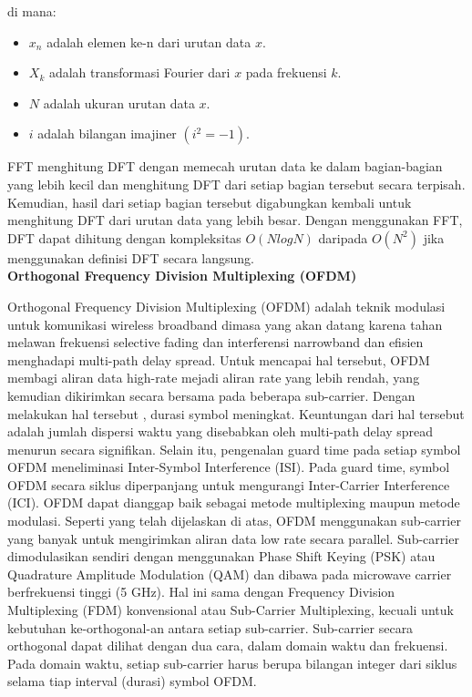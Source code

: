 \documentclass{article}
\begin{document}
di mana:
\begin{itemize}
    \item $x_n$ adalah elemen ke-n dari urutan data $x$.
    \item $X_k$ adalah transformasi Fourier dari $x$ pada frekuensi $k$.
    \item $N$ adalah ukuran urutan data $x$.
    \item $i$ adalah bilangan imajiner $(i^2 = -1)$.
\end{itemize}

FFT menghitung DFT dengan memecah urutan data ke dalam bagian-bagian yang lebih kecil dan menghitung DFT dari setiap bagian tersebut secara terpisah. Kemudian, hasil dari setiap bagian tersebut digabungkan kembali untuk menghitung DFT dari urutan data yang lebih besar. Dengan menggunakan FFT, DFT dapat dihitung dengan kompleksitas $O(N log N)$ daripada $O(N^2)$ jika menggunakan definisi DFT secara langsung.\\

\textbf{Orthogonal Frequency Division Multiplexing (OFDM)}

Orthogonal Frequency Division Multiplexing (OFDM) adalah teknik modulasi untuk komunikasi wireless broadband dimasa yang akan datang karena tahan melawan frekuensi selective fading dan interferensi narrowband dan efisien menghadapi multi-path delay spread. Untuk mencapai hal tersebut, OFDM membagi aliran data high-rate mejadi aliran rate yang lebih rendah, yang kemudian dikirimkan secara bersama pada beberapa sub-carrier. Dengan melakukan hal tersebut , durasi symbol meningkat. Keuntungan dari hal tersebut adalah jumlah dispersi waktu yang disebabkan oleh multi-path delay spread menurun secara signifikan. Selain itu, pengenalan guard time pada setiap symbol OFDM meneliminasi Inter-Symbol Interference (ISI). Pada guard time, symbol OFDM secara siklus diperpanjang untuk mengurangi Inter-Carrier Interference (ICI). OFDM dapat dianggap baik sebagai metode multiplexing maupun metode modulasi. Seperti yang telah dijelaskan di atas, OFDM menggunakan sub-carrier yang banyak untuk mengirimkan aliran data low rate secara parallel. Sub-carrier dimodulasikan sendiri dengan menggunakan Phase Shift Keying (PSK) atau Quadrature Amplitude Modulation (QAM) dan dibawa pada microwave carrier berfrekuensi tinggi (5 GHz). Hal ini sama dengan Frequency Division Multiplexing (FDM) konvensional atau Sub-Carrier Multiplexing, kecuali untuk kebutuhan ke-orthogonal-an antara setiap sub-carrier. Sub-carrier secara orthogonal dapat dilihat dengan dua cara, dalam domain waktu dan frekuensi. Pada domain waktu, setiap sub-carrier harus berupa bilangan integer dari siklus selama tiap interval (durasi) symbol OFDM.
\end{document}
